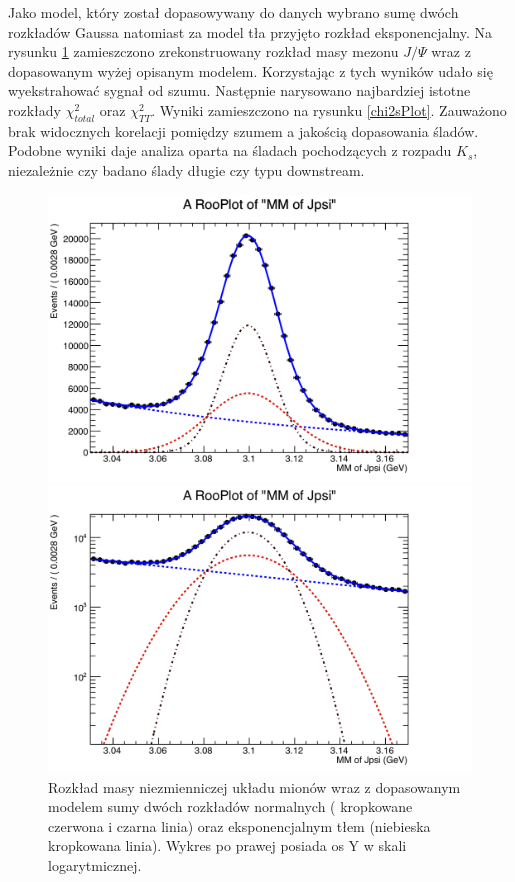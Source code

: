 Jako model, który został dopasowywany do danych wybrano sumę dwóch rozkładów Gaussa natomiast za model tła przyjęto rozkład eksponencjalny. Na rysunku \ref{massJPsi} zamieszczono zrekonstruowany rozkład masy mezonu $J / \Psi$  wraz z dopasowanym wyżej opisanym modelem. Korzystając z tych wyników udało się wyekstrahować sygnał od szumu. Następnie narysowano najbardziej istotne rozkłady $\chi^2_{total}$ oraz $\chi^2_{TT}$. Wyniki zamieszczono na rysunku \ref{chi2sPlot}. Zauważono brak widocznych korelacji pomiędzy szumem a jakością dopasowania śladów. Podobne wyniki daje analiza oparta na śladach pochodzących z rozpadu $K_s$, niezależnie czy badano ślady długie czy typu downstream. 

\begin{figure}[H]    
\begin{minipage}[t]{0.5\textwidth}
\includegraphics[width=\linewidth]{rozdzial6/jpsi_mm_sPlot_RDfit.png}
\end{minipage}
\hspace{\fill}
\begin{minipage}[t]{0.5\textwidth}
\includegraphics[width=\linewidth]{rozdzial6/jpsi_mm_sPlot_RDfit_logy.png}
\end{minipage}
\caption{Rozkład masy niezmienniczej układu mionów wraz z dopasowanym modelem sumy dwóch rozkładów normalnych ( kropkowane czerwona i czarna linia) oraz eksponencjalnym tłem (niebieska kropkowana linia). Wykres po prawej posiada os Y w skali logarytmicznej.} \label{massJPsi}
\end{figure} 


